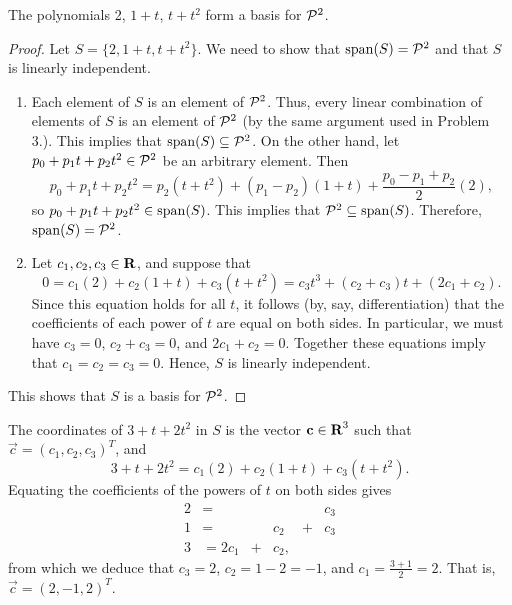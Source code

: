 \documentclass{homework}
\begin{document}
	\question The polynomials 2, $1+t$, $t + t^2$ form a basis for $\mathcal{P}^2$.
	\begin{proof}
		Let $S = \{2, 1+t, t+t^2\}$. We need to show that $\mathrm{span}(S) = \mathcal{P}^2$ and that $S$ is linearly independent.
		\begin{enumerate}[label=\arabic*.]
			\item Each element of $S$ is an element of $\mathcal{P}^2$. Thus, every linear combination of elements of $S$ is an element of $\mathcal{P}^2$ (by the same argument used in Problem 3.). This implies that $\mathrm{span}(S) \subseteq \mathcal{P}^2$. On the other hand, let $p_0 + p_1t + p_2t^2 \in \mathcal{P}^2$ be an arbitrary element. Then
			\begin{equation*}
				p_0 + p_1t + p_2t^2 = p_2(t+ t^2) + (p_1 - p_2)(1+t) + \frac{p_0 - p_1 + p_2}{2}(2),
			\end{equation*}
			so $p_0 + p_1t + p_2t^2 \in \mathrm{span}(S)$. This implies that $\mathcal{P}^2 \subseteq \mathrm{span}(S)$. Therefore, $\mathrm{span}(S) = \mathcal{P}^2$.
			
			\item Let $c_1,c_2,c_3 \in \textnormal{\bf R}$, and suppose that
			\begin{equation*}
				0 = c_1(2) + c_2(1+t) + c_3(t+t^2) = c_3t^3 + (c_2 + c_3)t + (2c_1 + c_2).
			\end{equation*}
			Since this equation holds for all $t$, it follows (by, say, differentiation) that the coefficients of each power of $t$ are equal on both sides. In particular, we must have $c_3 =0$, $c_2 + c_3 =0$, and $2c_1 + c_2 = 0$. Together these equations imply that $c_1 = c_2 = c_3 = 0$. Hence, $S$ is linearly independent.
		\end{enumerate}
		This shows that $S$ is a basis for $\mathcal{P}^2$.
	\end{proof}
	
	The coordinates of $3 + t + 2t^2$ in $S$ is the vector $\mathbf{c} \in \textnormal{\bf R}^3$ such that $\vec{c} = (c_1,c_2,c_3)^T$, and
	\begin{equation*}
		3 + t + 2t^2 = c_1(2) + c_2(1+t) + c_3(t+t^2).
	\end{equation*}
	Equating the coefficients of the powers of $t$ on both sides gives
	\begin{equation*}
		\begin{alignedat}{3}
		2 &= && && c_3\\
		1 &= &&c_2 &{}+{}&c_3\\
		3 &= 2c_1 &{}+{}& c_2,
		\end{alignedat}
	\end{equation*}
	from which we deduce that $c_3 = 2$, $c_2 = 1-2 = -1$, and $c_1 = \frac{3 +1}{2} = 2$. That is, $\vec{c} = (2, -1, 2)^T$.
	
\end{document}
